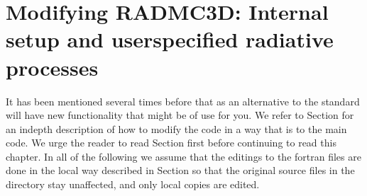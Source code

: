 \documentclass[letterpaper,10pt,english]{sphinxmanual}
\begin{document}
\chapter{Modifying RADMC\sphinxhyphen{}3D: Internal setup and user\sphinxhyphen{}specified radiative processes}
\label{\detokenize{internalsetup:modifying-radmc-3d-internal-setup-and-user-specified-radiative-processes}}\label{\detokenize{internalsetup:chap-internal-setup}}\label{\detokenize{internalsetup::doc}}
It has been mentioned several times before that as an alternative to the
standard  will have new
functionality that might be of use for you. We refer to Section
{\hyperref[\detokenize{installation:sec-special-purpose-compile}]{}} for an in\sphinxhyphen{}depth description of how to
modify the code in a way that is  to the main code. We
urge the reader to read Section {\hyperref[\detokenize{installation:sec-special-purpose-compile}]{}} first
before continuing to read this chapter. In all of the following we assume
that the editings to the fortran files are done in the local way described
in Section {\hyperref[\detokenize{installation:sec-special-purpose-compile}]{}} so that the original source
files in the  directory stay unaffected, and only local
copies are edited.
\end{document}

